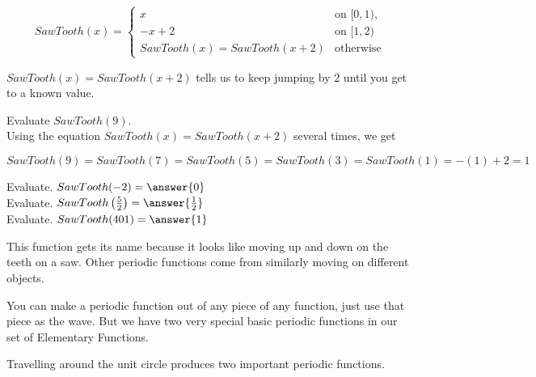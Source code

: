 \documentclass{ximera}
\begin{document}
\[
SawTooth(x) = 
\begin{cases}
  x &\text{on $[0,1)$,} \\
  -x+2 &\text{on $[1,2)$} \\ 
  SawTooth(x) = SawTooth(x+2) & \text{otherwise}
\end{cases}
\]


$SawTooth(x) = SawTooth(x+2)$ tells us to keep jumping by $2$ until you get to a known value.


\begin{example}


Evaluate  $SawTooth(9)$. \\

Using the equation $SawTooth(x) = SawTooth(x+2)$ several times, we get 


\[
SawTooth(9) = SawTooth(7) = SawTooth(5) = SawTooth(3) = SawTooth(1) = -(1) + 2 = 1
\]


\begin{question}

Evaluate.  $SawTooth(-2) = \answer{0}$ \\

Evaluate.  $SawTooth\left( \frac{5}{2} \right) = \answer{\frac{1}{2}}$ \\

Evaluate.  $SawTooth(401) = \answer{1}$

\end{question}


\end{example}








This function gets its name because it looks like moving up and down on the teeth on a saw. Other periodic functions come from similarly moving on different objects. 




You can make a periodic function out of any piece of any function, just use that piece as the wave. But we have two very special basic periodic functions in our set of Elementary Functions.



Travelling around the unit circle produces two important periodic functions.
\end{document}
